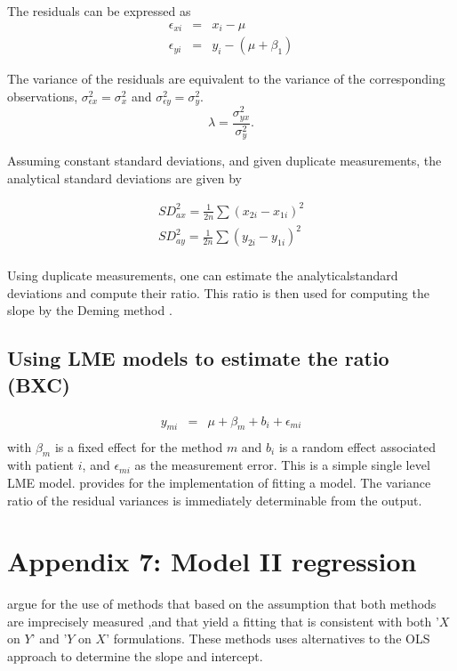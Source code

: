 \documentclass[12pt, a4paper]{report}
\theoremstyle{plain}
\theoremstyle{definition}
\theoremstyle{remark}
\begin{document}
The residuals can be expressed as
\begin{eqnarray*}
	\epsilon_{xi} &=& x_{i} - \mu  \\
	\epsilon_{yi} &=& y_{i} - (\mu + \beta_{1}) 
\end{eqnarray*}

The variance of the residuals are equivalent to the variance of the corresponding observations, $\sigma^{2}_{\epsilon x} =
\sigma^{2}_{x}$ and $\sigma^{2}_{\epsilon y} = \sigma^{2}_{y}$.
\begin{equation}
\lambda = \frac{\sigma^{2}_{yx}}{\sigma^{2}_{y}}.
\end{equation}

Assuming constant standard deviations, and given duplicate measurements, the analytical standard deviations are given by

\begin{eqnarray*}
	SD^{2}_{ax} = \frac{1}{2n} \sum (x_{2i} - x_{1i})^{2}\\
	SD^{2}_{ay} = \frac{1}{2n} \sum (y_{2i} - y_{1i})^{2}\\
\end{eqnarray*}

Using duplicate measurements, one can estimate the analyticalstandard deviations and compute their ratio. This ratio is then used for computing the slope by the Deming method \citep{linnet98}.

\subsection{Using LME models to estimate the ratio (BXC) }
	
	\begin{eqnarray*}
		y_{mi} &=& \mu + \beta_{m} + b_{i} + \epsilon_{mi}\\
	\end{eqnarray*}
with $\beta_{m}$ is a fixed effect for the method $m$ and $b_{i}$ is a random effect associated with patient $i$, and
	$\epsilon_{mi}$ as the measurement error. This is a simple single level LME model. \citet{pb} provides for the implementation of fitting a model. The variance ratio of the residual variances is immediately determinable from the output. 
	
		
		
\section{Appendix 7: Model II regression}
\citet{CornCoch} argue for the use of methods that based on
the assumption that both methods are imprecisely measured ,and
that yield a fitting that is consistent with both '$X$ on $Y$' and
'$Y$ on $X$' formulations. These methods uses alternatives to the
OLS approach to determine the slope and intercept.
\end{document}
